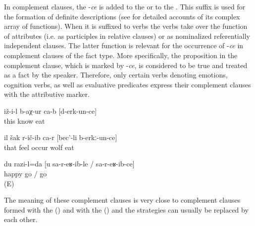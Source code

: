 In complement clauses, the  -\textit{ce} is added to the   or to the  . This suffix is used for the formation of definite descriptions (see  for detailed accounts of its complex array of functions). When it is suffixed to verbs the verbs take over the function of attributes (i.e. as participles in relative clauses) or as nominalized referentially independent clauses. The latter function is relevant for the occurrence of -\textit{ce} in complement clauses of the fact type. More specifically, the proposition in the complement clause, which is marked by -\textit{ce}, is considered to be true and treated as a fact by the speaker. Therefore, only certain verbs denoting emotions, cognition verbs, as well as evaluative predicates express their complement clauses with the attributive marker. 
%
\begin{exe}
	\ex	\label{ex:He got to know that (they) ate (them)}
	\gll	iž-i-l	b-aχ-ur	ca-b	[d-erk-un-ce]\\
		this	know		eat\\
	\glt	{}

	\ex	\label{ex:‎‎She suspected that the wolf had eaten (the sisters)}
	\gll	il	šak	r-ič-ib	ca-r	[bec'-li	b-erkː-un-ce]\\
		that	feel	occur		wolf	eat\\
	\glt	{}

	\ex	\label{ex:‎‎‎I am happy that you came}
	\gll	du	razi-l=da	[u	sa-r-eʁ-ib-le	/	sa-r-eʁ-ib-ce]\\
			happy		go	/	go\\
	\glt	{} (E)
\end{exe}

The meaning of these complement clauses is very close to complement clauses formed with the   () and with the   () and the strategies can usually be replaced by each other.

